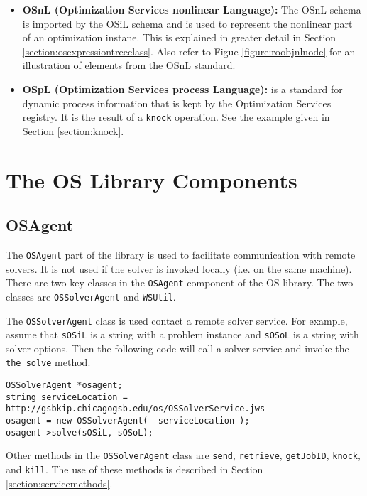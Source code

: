 \documentclass[11pt]{article}
\newcounter{Fig}
\renewcommand{\_}{{\char"5F}}
\renewcommand{\{}{{\char"7B}}
\renewcommand{\}}{{\char"7D}}
\renewcommand{\^}{{\char"0D}}
\renewcommand{\'}{{\char"0D}}
\begin{document}
\begin{itemize}
\item[] {\bf OSnL (Optimization Services nonlinear Language):}  The OSnL schema is imported by the OSiL schema and is used to represent the nonlinear part of an optimization instane. This is explained in greater detail in Section \ref{section:osexpressiontreeclass}. Also refer to Figue \ref{figure:roobjnlnode} for an illustration of elements from the OSnL standard. 



\item[]   {\bf OSpL (Optimization Services process Language):} is a standard for dynamic process information that is kept by the Optimization Services registry. 
It is the result of a {\tt knock} operation. See the example given in Section \ref{section:knock}.

\end{itemize}




\section{The OS Library Components}\label{section:oslibrary}

\subsection{OSAgent}\label{section:osagent}

The {\tt OSAgent}  part of the library is used to facilitate communication with remote solvers. It is not used if the solver is invoked locally (i.e. on the same machine).   There are two key classes in the {\tt OSAgent} component of the OS library. The two classes are {\tt OSSolverAgent} and {\tt WSUtil}.

The {\tt OSSolverAgent} class is used  contact a remote solver service.  For example, assume that {\tt sOSiL} is a string with a problem instance and {\tt sOSoL} is a string with solver options. Then the following code will call a solver service and invoke the {\tt the solve} method.
\begin{verbatim}
OSSolverAgent *osagent;
string serviceLocation = http://gsbkip.chicagogsb.edu/os/OSSolverService.jws
osagent = new OSSolverAgent(  serviceLocation );
osagent->solve(sOSiL, sOSoL);
\end{verbatim}
Other methods in the {\tt OSSolverAgent} class are {\tt send}, {\tt retrieve}, {\tt getJobID}, {\tt knock}, and {\tt kill}.  The use of these methods is described in Section \ref{section:servicemethods}.
\end{document}
